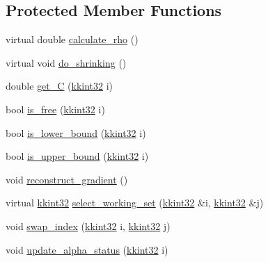 \subsection*{Protected Member Functions}
\begin{DoxyCompactItemize}
\item 
virtual double \hyperlink{class_s_v_m233_1_1_solver_a13eb797fa25522e9fcb3ed9f2d8c6b75}{calculate\+\_\+rho} ()
\item 
virtual void \hyperlink{class_s_v_m233_1_1_solver_a53a70e8c7d704fd1df943d8ccbdf7558}{do\+\_\+shrinking} ()
\item 
double \hyperlink{class_s_v_m233_1_1_solver_a403b18fda4eb67c8a51804a23f928960}{get\+\_\+C} (\hyperlink{namespace_k_k_b_a8fa4952cc84fda1de4bec1fbdd8d5b1b}{kkint32} i)
\item 
bool \hyperlink{class_s_v_m233_1_1_solver_a33c89aff34ffee2a9c8eab39f66ab7ae}{is\+\_\+free} (\hyperlink{namespace_k_k_b_a8fa4952cc84fda1de4bec1fbdd8d5b1b}{kkint32} i)
\item 
bool \hyperlink{class_s_v_m233_1_1_solver_a4385cbb679a61f75e464f545e8f1b7b9}{is\+\_\+lower\+\_\+bound} (\hyperlink{namespace_k_k_b_a8fa4952cc84fda1de4bec1fbdd8d5b1b}{kkint32} i)
\item 
bool \hyperlink{class_s_v_m233_1_1_solver_a5a357c7baa23e6899939e3571284d652}{is\+\_\+upper\+\_\+bound} (\hyperlink{namespace_k_k_b_a8fa4952cc84fda1de4bec1fbdd8d5b1b}{kkint32} i)
\item 
void \hyperlink{class_s_v_m233_1_1_solver_a21d6f3b1705e3c52f4dd46889eea473e}{reconstruct\+\_\+gradient} ()
\item 
virtual \hyperlink{namespace_k_k_b_a8fa4952cc84fda1de4bec1fbdd8d5b1b}{kkint32} \hyperlink{class_s_v_m233_1_1_solver_ae0275309f3d4ae9dccf0843bb944cc76}{select\+\_\+working\+\_\+set} (\hyperlink{namespace_k_k_b_a8fa4952cc84fda1de4bec1fbdd8d5b1b}{kkint32} \&i, \hyperlink{namespace_k_k_b_a8fa4952cc84fda1de4bec1fbdd8d5b1b}{kkint32} \&j)
\item 
void \hyperlink{class_s_v_m233_1_1_solver_a416ad5ff13353d12ee210bf287c8cddc}{swap\+\_\+index} (\hyperlink{namespace_k_k_b_a8fa4952cc84fda1de4bec1fbdd8d5b1b}{kkint32} i, \hyperlink{namespace_k_k_b_a8fa4952cc84fda1de4bec1fbdd8d5b1b}{kkint32} j)
\item 
void \hyperlink{class_s_v_m233_1_1_solver_a867866316d6029b4e9f1c22376bd1e0f}{update\+\_\+alpha\+\_\+status} (\hyperlink{namespace_k_k_b_a8fa4952cc84fda1de4bec1fbdd8d5b1b}{kkint32} i)
\end{DoxyCompactItemize}
